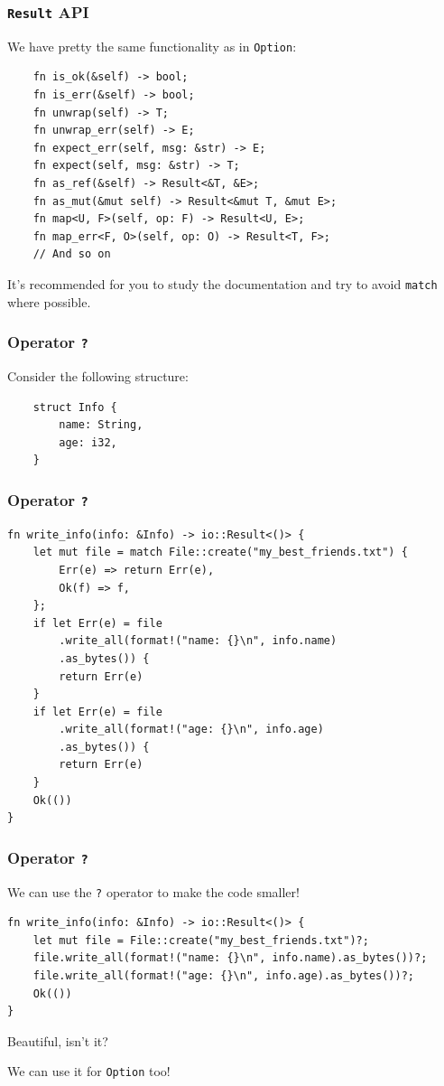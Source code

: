 \documentclass[aspectratio=1610,t]{beamer}
\begin{document}

\begin{frame}[fragile]
\frametitle{\texttt{Result} API}
We have pretty the same functionality as in \texttt{Option}:

\begin{verbatim}
    fn is_ok(&self) -> bool;
    fn is_err(&self) -> bool;
    fn unwrap(self) -> T;
    fn unwrap_err(self) -> E;
    fn expect_err(self, msg: &str) -> E;
    fn expect(self, msg: &str) -> T;
    fn as_ref(&self) -> Result<&T, &E>;
    fn as_mut(&mut self) -> Result<&mut T, &mut E>;
    fn map<U, F>(self, op: F) -> Result<U, E>;
    fn map_err<F, O>(self, op: O) -> Result<T, F>;
    // And so on
\end{verbatim}

It's recommended for you to study the documentation and try to avoid \texttt{match} where possible.
\end{frame}


\begin{frame}[fragile]
\frametitle{Operator \texttt{?}}
Consider the following structure:
\begin{verbatim}
    struct Info {
        name: String,
        age: i32,
    }
\end{verbatim}
\end{frame}


\begin{frame}[fragile,c]
\frametitle{Operator \texttt{?}}
\begin{verbatim}
fn write_info(info: &Info) -> io::Result<()> {
    let mut file = match File::create("my_best_friends.txt") {
        Err(e) => return Err(e),
        Ok(f) => f,
    };
    if let Err(e) = file
        .write_all(format!("name: {}\n", info.name)
        .as_bytes()) {
        return Err(e)
    }
    if let Err(e) = file
        .write_all(format!("age: {}\n", info.age)
        .as_bytes()) {
        return Err(e)
    }
    Ok(())
}
\end{verbatim}
\end{frame}


\begin{frame}[fragile]
\frametitle{Operator \texttt{?}}
We can use the \texttt{?} operator to make the code smaller!

\begin{verbatim}
fn write_info(info: &Info) -> io::Result<()> {
    let mut file = File::create("my_best_friends.txt")?;
    file.write_all(format!("name: {}\n", info.name).as_bytes())?;
    file.write_all(format!("age: {}\n", info.age).as_bytes())?;
    Ok(())
}
\end{verbatim}

Beautiful, isn't it?

We can use it for \texttt{Option} too!
\end{frame}
\end{document}
